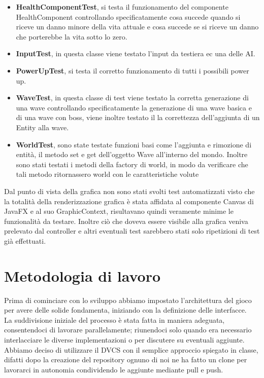 \documentclass[a4paper,12pt]{report}
\begin{document}
\begin{itemize}
	\item \textbf{HealthComponentTest}, si testa il funzionamento del componente HealthComponent controllando specificatamente cosa succede quando si riceve un danno minore della vita attuale e cosa succede se si riceve un danno che porterebbe la vita sotto lo zero.
	\item \textbf{InputTest}, in questa classe viene testato l’input da testiera ec una delle AI.
	\item \textbf{PowerUpTest}, si testa il corretto funzionamento di tutti i possibili power up.
	\item \textbf{WaveTest}, in questa classe di test viene testato la corretta generazione di una wave controllando specificatamente la generazione di una wave basica e di una wave con boss, viene inoltre testato il la correttezza dell’aggiunta di un Entity alla wave.
	\item \textbf{WorldTest}, sono state testate funzioni basi come l'aggiunta e rimozione di entità, il metodo set e get dell'oggetto  Wave all'interno del mondo. Inoltre sono stati testati i metodi della factory di world, in modo da verificare che tali metodo ritornassero world con le caratteristiche volute
\end{itemize}
Dal punto di vista della grafica non sono stati svolti test automatizzati visto che la totalità della renderizzazione grafica è stata affidata al componente Canvas di JavaFX e al suo GraphicContext, risultavano quindi veramente minime le funzionalità da testare. Inoltre ciò che doveva essere visibile alla grafica veniva prelevato dal controller e altri eventuali test sarebbero stati solo ripetizioni di test già effettuati.



\section{Metodologia di lavoro}

Prima di cominciare con lo sviluppo abbiamo impostato l’architettura del gioco per avere delle solide fondamenta, iniziando con la definizione delle interfacce.
\\
La suddivisione iniziale del processo è stata fatta in maniera adeguata, consentendoci di lavorare parallelamente; riunendoci solo quando era necessario interlacciare le diverse implementazioni o per discutere su eventuali aggiunte.
\\
Abbiamo deciso di utilizzare il DVCS con il semplice approccio spiegato in classe, difatti dopo la creazione del repository ognuno di noi ne ha fatto un clone per lavorarci in autonomia condividendo le aggiunte mediante pull e push.
\end{document}
